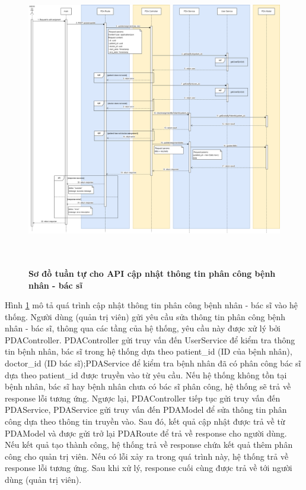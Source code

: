 \begin{figure}[H]
  \centering
  \includegraphics[width=16cm,height=13cm]{Images/sequence_api/editAssignment.png}
  \caption[Sơ đồ tuần tự cho API cập nhật thông tin phân công bệnh nhân - bác sĩ]{\bfseries \fontsize{12pt}{0pt}
  \selectfont Sơ đồ tuần tự cho API cập nhật thông tin phân công bệnh nhân - bác sĩ }
  \label{api_editPDA} %
\end{figure}
Hình \ref{api_editPDA} mô tả quá trình cập nhật thông tin phân công bệnh nhân - bác sĩ vào hệ thống. Người dùng (quản trị viên) gửi yêu cầu sửa thông tin phân công bệnh nhân - bác sĩ, thông qua các tầng của hệ thống, 
yêu cầu này được xử lý bởi PDAController. PDAController gửi truy vấn đến UserService để kiểm tra thông tin bệnh nhân, bác sĩ trong hệ thống dựa theo patient\_id (ID của bệnh nhân), doctor\_id (ID bác sĩ);PDAService để kiểm
tra bệnh nhân đã có phân công bác sĩ dựa theo patient\_id được truyền vào từ yêu cầu. Nếu hệ thống không tồn tại bệnh nhân, bác sĩ hay bệnh nhân chưa có bác sĩ phân công, hệ thống sẽ trả về response lỗi tương ứng. 
Ngược lại, PDAController tiếp tục gửi truy vấn đến PDAService, PDAService gửi truy vấn đến PDAModel để sửa thông tin phân công dựa theo thông tin truyền vào. Sau đó, kết quả cập nhật được trả về từ PDAModel và được gửi trở lại 
PDARoute để trả về response cho người dùng. Nếu kết quả tạo thành công, hệ thống trả về response chứa kết quả thêm phân công cho quản trị viên. 
Nếu có lỗi xảy ra trong quá trình này, hệ thống trả về response lỗi tương ứng. Sau khi xử lý, response cuối cùng được trả về tới người dùng (quản trị viên).

